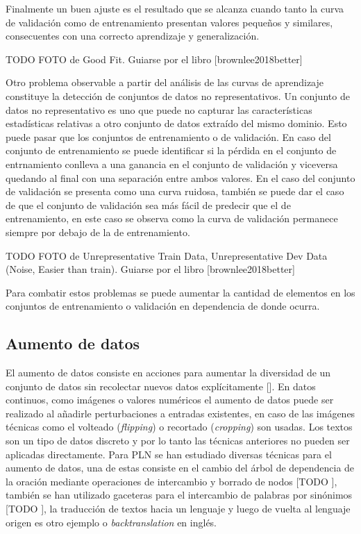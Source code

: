 Finalmente un buen ajuste es el resultado que se alcanza cuando tanto la curva de validación como de entrenamiento
presentan valores pequeños y similares, consecuentes con una correcto aprendizaje y generalización.

TODO FOTO de Good Fit. Guiarse por el libro [brownlee2018better]

Otro problema observable a partir del análisis de las curvas de aprendizaje constituye la detección de conjuntos
de datos no representativos. Un conjunto de datos no representativo es uno que puede no 
capturar las características estadísticas relativas a otro conjunto de datos extraído del mismo dominio.
Esto puede pasar que los conjuntos de entrenamiento o de validación. En caso del conjunto de entrenamiento
se puede identificar si la pérdida en el conjunto de entrnamiento conlleva a una ganancia en el conjunto de 
validación y viceversa quedando al final con una separación entre ambos valores. En el caso del conjunto de 
validación se presenta como una curva ruidosa, también se puede dar el caso de que el conjunto  de validación
sea más fácil de predecir que el de entrenamiento, en este caso se observa como la curva de validación permanece
siempre por debajo de la de entrenamiento.

TODO FOTO de Unrepresentative Train Data, Unrepresentative Dev Data (Noise, Easier than train). Guiarse por el libro [brownlee2018better]

Para combatir estos problemas se puede aumentar la cantidad de elementos en los conjuntos de entrenamiento o 
validación en dependencia de donde ocurra.

\subsection{Aumento de datos}

El aumento de datos consiste en acciones para aumentar la diversidad de un conjunto de datos sin recolectar
nuevos datos explícitamente [\cite{feng2021data}]. En datos continuos, como imágenes o valores numéricos el 
aumento de datos puede ser realizado al añadirle perturbaciones a entradas existentes, en caso de las imágenes 
técnicas como el volteado (\emph{flipping}) o recortado (\emph{cropping}) son usadas. Los textos son un tipo 
de datos discreto y por lo tanto las técnicas anteriores no pueden ser aplicadas directamente. Para PLN
se han estudiado diversas técnicas para el aumento de datos, una de estas consiste en el cambio del árbol de 
dependencia de la oración mediante operaciones de intercambio y borrado de nodos [TODO \cite{}], también se han utilizado 
gaceteras para el intercambio de palabras por sinónimos [TODO \cite{}], la traducción de textos hacia un lenguaje y luego 
de vuelta al lenguaje origen es otro ejemplo o \emph{backtranslation} en inglés. 

